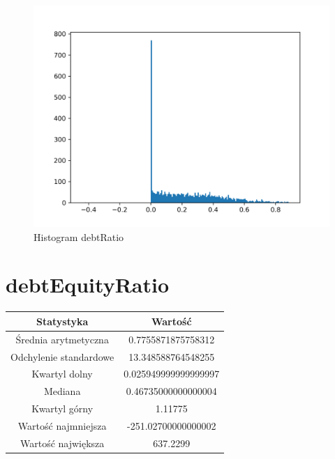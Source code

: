 \documentclass{article}
\begin{document}
\begin{figure}[h!]
    \includegraphics[width=\linewidth]{variables/debtRatio.png}
    \caption{Histogram debtRatio }
\end{figure}\section{ debtEquityRatio }

\begin{center}
    \begin{tabular}{|c | c|} 
    \hline
    Statystyka & Wartość \\
    \hline\hline
    Średnia arytmetyczna & 0.7755871875758312 \\ 
    \hline
    Odchylenie standardowe & 13.348588764548255 \\
    \hline
    Kwartyl dolny & 0.025949999999999997 \\
    \hline
    Mediana & 0.46735000000000004 \\
    \hline
    Kwartyl górny & 1.11775 \\
    \hline
    Wartość najmniejsza & -251.02700000000002 \\
    \hline
    Wartość największa & 637.2299 \\
    \hline
   \end{tabular}
\end{center}
\end{document}
